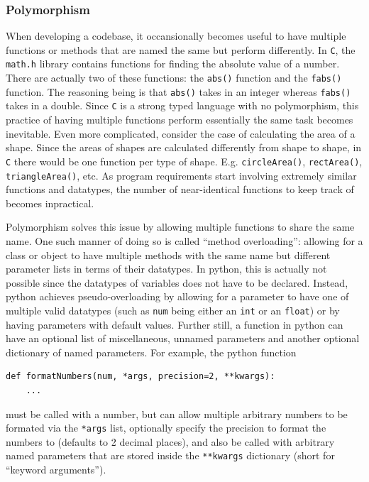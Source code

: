 \documentclass[11pt]{article}
\begin{document}
\subsubsection{Polymorphism}

When developing a codebase, it occansionally becomes useful to have multiple functions or methods that are named the same but perform differently. In \texttt{C}, the \texttt{math.h} \gls{library} contains functions for finding the absolute value of a number. There are actually two of these functions: the \texttt{abs()} function and the \texttt{fabs()} function. The reasoning being is that \texttt{abs()} takes in an integer whereas \texttt{fabs()} takes in a double. Since \texttt{C} is a strong typed language with no polymorphism, this practice of having multiple functions perform essentially the same task becomes inevitable. Even more complicated, consider the case of calculating the area of a shape. Since the areas of shapes are calculated differently from shape to shape, in \texttt{C} there would be one function per type of shape. E.g. \texttt{circleArea()}, \texttt{rectArea()}, \texttt{triangleArea()}, etc. As program requirements start involving extremely similar functions and datatypes, the number of near-identical functions to keep track of becomes inpractical.

Polymorphism solves this issue by allowing multiple functions to share the same name. One such manner of doing so is called ``method overloading'': allowing for a \gls{class} or \gls{object} to have multiple methods with the same name but different parameter lists in terms of their datatypes. In \Gls{python}, this is actually not possible since the datatypes of variables does not have to be declared. Instead, \Gls{python} achieves pseudo-overloading by allowing for a parameter to have one of multiple valid datatypes (such as \texttt{num} being either an \texttt{int} or an \texttt{float}) or by having parameters with default values. Further still, a function in \Gls{python} can have an optional list of miscellaneous, unnamed parameters and another optional dictionary of named parameters. For example, the \Gls{python} function

\begin{verbatim}
def formatNumbers(num, *args, precision=2, **kwargs):
    ...
\end{verbatim}

\noindent
must be called with a number, but can allow multiple arbitrary numbers to be formated via the \texttt{*args} list, optionally specify the precision to format the numbers to (defaults to 2 decimal places), and also be called with arbitrary named parameters that are stored inside the \texttt{**kwargs} dictionary (short for ``keyword arguments'').
\end{document}
